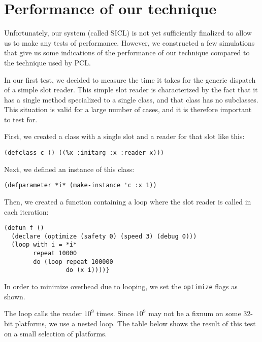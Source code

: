 \section{Performance of our technique}

Unfortunately, our system (called SICL) is not yet sufficiently
finalized to allow us to make any tests of performance.  However, we
constructed a few simulations that give us some indications of the
performance of our technique compared to the technique used by PCL.

In our first test, we decided to measure the time it takes for the
generic dispatch of a simple slot reader.  This simple slot reader is
characterized by the fact that it has a single method specialized
to a single class, and that class has no subclasses.  This situation
is valid for a large number of cases, and it is therefore important to
test for.

First, we created a class with a single slot and a reader for that
slot like this:

{\small\begin{verbatim}
(defclass c () ((%x :initarg :x :reader x)))  
\end{verbatim}}

Next, we defined an instance of this class:

{\small\begin{verbatim}
(defparameter *i* (make-instance 'c :x 1))
\end{verbatim}}

Then, we created a function containing a loop where the slot reader is
called in each iteration: 

{\small\begin{verbatim}
(defun f ()
  (declare (optimize (safety 0) (speed 3) (debug 0)))
  (loop with i = *i*
        repeat 10000
        do (loop repeat 100000
                 do (x i))))}
\end{verbatim}}

In order to minimize overhead due to looping, we set the
\texttt{optimize} flags as shown.

The loop calls the reader $10^9$ times.  Since $10^9$ may not be a
fixnum on some $32$-bit platforms, we use a nested loop.  The table
below shows the result of this test on a small selection of platforms.


